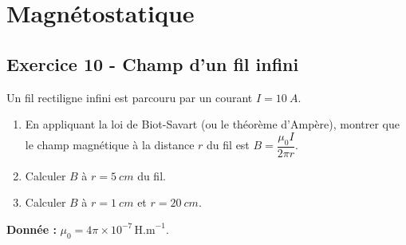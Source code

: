 \documentclass[12pt,a4paper]{article}
\begin{document}
\newpage
\section{Magnétostatique}

\subsection*{Exercice 10 - Champ d'un fil infini \niveau{\facile}}

\begin{boiteexercice}
Un fil rectiligne infini est parcouru par un courant $I = \qty{10}{A}$.
\begin{enumerate}
  \item En appliquant la loi de Biot-Savart (ou le théorème d'Ampère), montrer que le champ magnétique à la distance $r$ du fil est $B = \dfrac{\mu_0 I}{2\pi r}$.
  \item Calculer $B$ à $r = \qty{5}{cm}$ du fil.
  \item Calculer $B$ à $r = \qty{1}{cm}$ et $r = \qty{20}{cm}$.
\end{enumerate}
\textbf{Donnée :} $\mu_0 = 4\pi\times10^{-7}\,\text{H.m}^{-1}$.
\end{boiteexercice}
\end{document}
